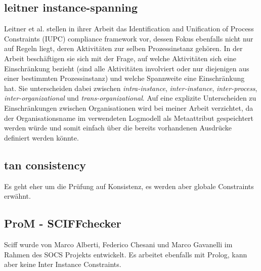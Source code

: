 \subsection{leitner instance-spanning}
Leitner et al. \cite{wang_definition} stellen in ihrer Arbeit das Identification and Unification of Process Constraints (IUPC) compliance framework vor, dessen Fokus ebenfalls nicht nur auf Regeln liegt, deren Aktivitäten zur selben Prozessinstanz gehören. In der Arbeit beschäftigen sie sich mit der Frage, auf welche Aktivitäten sich eine Einschränkung bezieht (sind alle Aktivitäten involviert oder nur diejenigen aus einer bestimmten Prozessinstanz) und welche Spannweite eine Einschränkung hat. Sie unterscheiden dabei zwischen \textit{intra-instance}, \textit{inter-instance}, \textit{inter-process}, \textit{inter-organizational} und \textit{trans-organizational}. Auf eine explizite Unterscheiden zu Einschränkungen zwischen Organisationen wird bei meiner Arbeit verzichtet, da der Organisationsname im verwendeten Logmodell als Metaattribut gespeichtert werden würde und somit einfach über die bereits vorhandenen Ausdrücke definiert werden könnte.
\subsection{tan consistency}
Es geht eher um die Prüfung auf Konsistenz, es werden aber globale Constraints erwähnt.




\subsection{ProM - SCIFFchecker}
Sciff wurde von Marco Alberti, Federico Chesani und Marco Gavanelli im Rahmen des SOCS Projekts entwickelt. Es arbeitet ebenfalls mit Prolog, kann aber keine Inter Instance Constraints.



